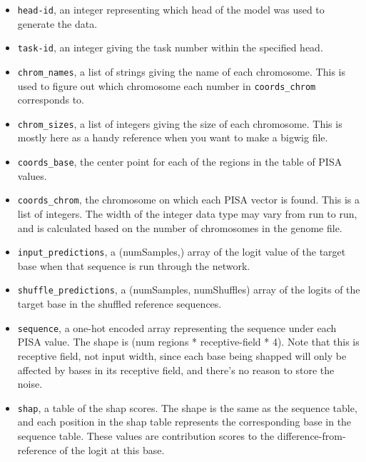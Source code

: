\documentclass{article}
\begin{document}
\begin{itemize}
    \item \texttt{head-id}, an integer representing which head of the model was
        used to generate the data.
    \item \texttt{task-id}, an integer giving the task number within the
        specified head.
    \item \texttt{chrom\_names}, a list of strings giving the name of each
        chromosome.
        This is used to figure out which chromosome each number in
        \texttt{coords\_chrom} corresponds to.
    \item \texttt{chrom\_sizes}, a list of integers giving the size of each
        chromosome.
        This is mostly here as a handy reference when you want to make a bigwig
        file.
    \item \texttt{coords\_base}, the center point for each of the regions in the
        table of PISA values.
    \item \texttt{coords\_chrom}, the chromosome on which each PISA vector is
        found.
        This is a list of integers.
        The width of the integer data type may vary from run to run, and is
        calculated based on the number of chromosomes in the genome file.
    \item \texttt{input\_predictions}, a (numSamples,) array of the logit value
        of the target base when that sequence is run through the network.
    \item \texttt{shuffle\_predictions}, a (numSamples, numShuffles) array of
        the logits of the target base in the shuffled reference sequences.
    \item \texttt{sequence}, a one-hot encoded array representing the sequence
        under each PISA value.
        The shape is (num regions * receptive-field * 4).
        Note that this is receptive field, not input width, since each base
        being shapped will only be affected by bases in its receptive field,
        and there's no reason to store the noise.
    \item \texttt{shap}, a table of the shap scores.
        The shape is the same as the sequence table, and each position in the
        shap table represents the corresponding base in the sequence table.
        These values are contribution scores to the difference-from-reference
        of the logit at this base.

\end{itemize}


\newpage
\end{document}
